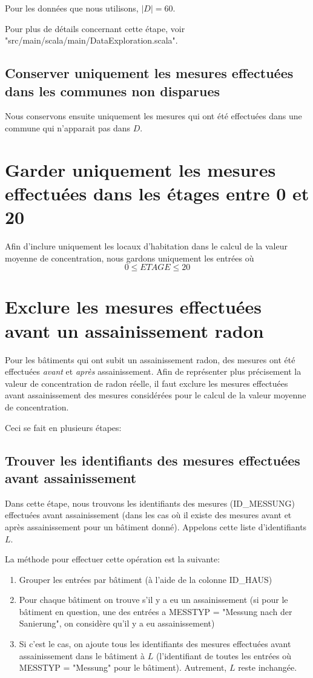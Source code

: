 Pour les données que nous utilisons, $|D| = 60$.

Pour plus de détails concernant cette étape, voir "src/main/scala/main/DataExploration.scala".

\subsection{Conserver uniquement les mesures effectuées dans les communes non disparues}
Nous conservons ensuite uniquement les mesures qui ont été effectuées dans une commune qui n'apparait pas dans $D$.


\section{Garder uniquement les mesures effectuées dans les étages entre 0 et 20}\label{filter:ETAGE}
Afin d'inclure uniquement les locaux d'habitation dans le calcul de la valeur moyenne de concentration, nous gardons uniquement les entrées où 
\begin{equation}
0 \leq ETAGE \leq 20
\end{equation}


\section{Exclure les mesures effectuées avant un assainissement radon}\label{filter:SANIERUNG}
Pour les bâtiments qui ont subit un assainissement radon, des mesures ont été effectuées \textit{avant} et \textit{après} assainissement. Afin de représenter plus précisement la valeur de concentration de radon réelle, il faut exclure les mesures effectuées avant assainissement des mesures considérées pour le calcul de la valeur moyenne de concentration.

Ceci se fait en plusieurs étapes:
\subsection{Trouver les identifiants des mesures effectuées avant assainissement}
Dans cette étape, nous trouvons les identifiants des mesures (ID\_MESSUNG) effectuées avant assainissement (dans les cas où il existe des mesures avant et après assainissement pour un bâtiment donné). Appelons cette liste d'identifiants $L$.

La méthode pour effectuer cette opération est la suivante:
\begin{enumerate}
\item Grouper les entrées par bâtiment (à l'aide de la colonne ID\_HAUS)
\item Pour chaque bâtiment on trouve s'il y a eu un assainissement (si pour le bâtiment en question, une des entrées a MESSTYP = "Messung nach der Sanierung", on considère qu'il y a eu assainissement)
\item Si c'est le cas, on ajoute tous les identifiants des mesures effectuées avant assainissement dans le bâtiment à $L$ (l'identifiant de toutes les entrées où MESSTYP = "Messung" pour le bâtiment). Autrement, $L$ reste inchangée.
\end{enumerate}


